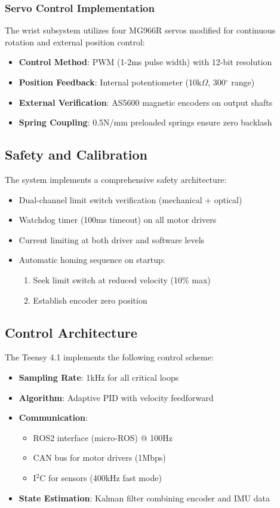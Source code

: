 \subsubsection{Servo Control Implementation}
The wrist subsystem utilizes four MG966R servos modified for continuous rotation and external position control:
\begin{itemize}
    \item \textbf{Control Method}: PWM (1-2ms pulse width) with 12-bit resolution
    \item \textbf{Position Feedback}: Internal potentiometer (10k$\Omega$, 300$^\circ$ range)
    \item \textbf{External Verification}: AS5600 magnetic encoders on output shafts
    \item \textbf{Spring Coupling}: 0.5N/mm preloaded springs ensure zero backlash
\end{itemize}

\subsection{Safety and Calibration}
The system implements a comprehensive safety architecture:
\begin{itemize}
    \item Dual-channel limit switch verification (mechanical + optical)
    \item Watchdog timer (100ms timeout) on all motor drivers
    \item Current limiting at both driver and software levels
    \item Automatic homing sequence on startup:
    \begin{enumerate}
        \item Seek limit switch at reduced velocity (10\% max)
        \item Establish encoder zero position
    \end{enumerate}
\end{itemize}

\subsection{Control Architecture}
The Teensy 4.1 implements the following control scheme:
\begin{itemize}
    \item \textbf{Sampling Rate}: 1kHz for all critical loops
    \item \textbf{Algorithm}: Adaptive PID with velocity feedforward
    \item \textbf{Communication}:
    \begin{itemize}
        \item ROS2 interface (micro-ROS) @ 100Hz
        \item CAN bus for motor drivers (1Mbps)
        \item I$^2$C for sensors (400kHz fast mode)
    \end{itemize}
    \item \textbf{State Estimation}: Kalman filter combining encoder and IMU data
\end{itemize}

